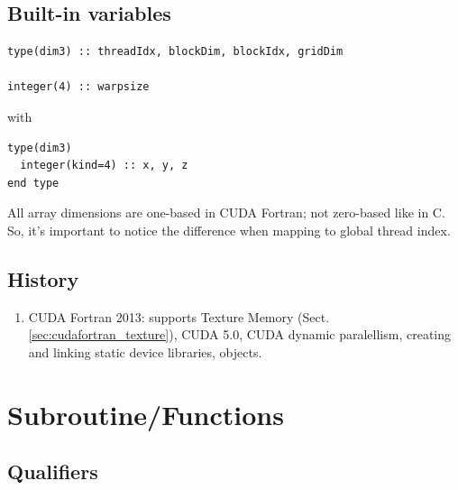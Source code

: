 \subsection{Built-in variables}
\label{sec:built-variables-1}

\begin{lstlisting}
type(dim3) :: threadIdx, blockDim, blockIdx, gridDim

integer(4) :: warpsize
\end{lstlisting}
with
\begin{lstlisting}
type(dim3) 
  integer(kind=4) :: x, y, z
end type
\end{lstlisting}

All array dimensions are one-based in CUDA Fortran; not zero-based
like in C. So, it's important to notice the difference when mapping to
global thread index.

\subsection{History}

\begin{enumerate}
  \item CUDA Fortran 2013: supports Texture Memory
  (Sect.\ref{sec:cudafortran_texture}), CUDA 5.0, CUDA dynamic paralellism,
  creating and linking static device libraries, objects.
\end{enumerate}

\section{Subroutine/Functions}
\label{sec:subroutinefunctions}

\subsection{Qualifiers}
\label{sec:qualifiers}

